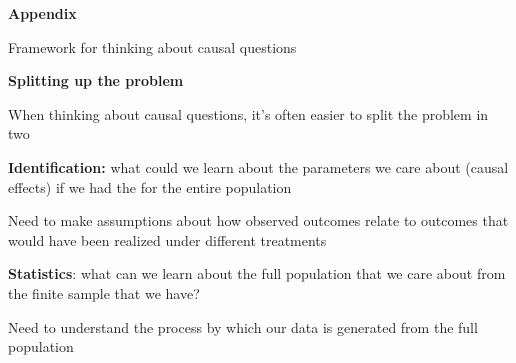 \documentclass[11pt, aspectratio=169]{beamer}
\newenvironment{wideitemize}{\itemize\addtolength{\itemsep}{5pt}}{\enditemize}
\begin{document}
\appendix

\begin{frame}{\bf \large Appendix}
	
	\huge Framework for thinking about causal questions
\end{frame}

\begin{frame}[label = framework]{\bf \large Splitting up the problem \hyperlink{splitprob}{}}
	\begin{wideitemize}
		
		\item
		When thinking about causal questions, it's often easier to split the problem in two
		
		\item
		\textbf{Identification:} what could we learn about the parameters we care about (causal effects) if we had the  for the entire population
		\begin{wideitemize}
			\item 
			Need to make assumptions about how observed outcomes relate to outcomes that would have been realized under different treatments
		\end{wideitemize}
		
		\item
		\textbf{Statistics}: what can we learn about the full population that we care about from the finite sample that we have?
		\begin{wideitemize}
			\item 
			Need to understand the process by which our data is generated from the full population
		\end{wideitemize} 	
		
	\end{wideitemize}	
	
	
\end{frame}
\end{document}

